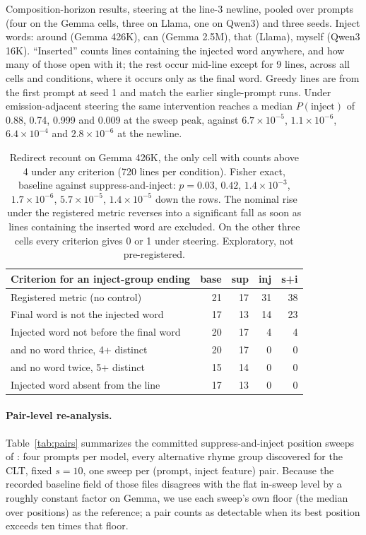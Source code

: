 \documentclass[11pt]{article}
\begin{document}
\begin{table}[t]
\caption{Composition-horizon results, steering at the line-3 newline, pooled over prompts (four on the Gemma cells, three on Llama, one on Qwen3) and three seeds. Inject words: around (Gemma 426K), can (Gemma 2.5M), that (Llama), myself (Qwen3 16K). ``Inserted'' counts lines containing the injected word anywhere, and how many of those open with it; the rest occur mid-line except for 9 lines, across all cells and conditions, where it occurs only as the final word. Greedy lines are from the first prompt at seed 1 and match the earlier single-prompt runs. Under emission-adjacent steering the same intervention reaches a median $P(\text{inject})$ of 0.88, 0.74, 0.999 and 0.009 at the sweep peak, against $6.7\times10^{-5}$, $1.1\times10^{-6}$, $6.4\times10^{-4}$ and $2.8\times10^{-6}$ at the newline.}
\label{tab:horizon}
\end{table}

\begin{table}[h]
\centering\footnotesize
\begin{tabular}{@{}R{4.1cm}rrrr@{}}
\toprule
Criterion for an inject-group ending & base & sup & inj & s+i \\
\midrule
Registered metric (no control) & 21 & 17 & 31 & 38 \\
Final word is not the injected word & 17 & 13 & 14 & 23 \\
Injected word not before the final word & 20 & 17 & 4 & 4 \\
\quad and no word thrice, 4+ distinct & 20 & 17 & 0 & 0 \\
\quad and no word twice, 5+ distinct & 15 & 14 & 0 & 0 \\
Injected word absent from the line & 17 & 13 & 0 & 0 \\
\bottomrule
\end{tabular}
\caption{Redirect recount on Gemma 426K, the only cell with counts above 4 under any criterion (720 lines per condition). Fisher exact, baseline against suppress-and-inject: $p=0.03$, $0.42$, $1.4\times10^{-3}$, $1.7\times10^{-6}$, $5.7\times10^{-5}$, $1.4\times10^{-5}$ down the rows. The nominal rise under the registered metric reverses into a significant fall as soon as lines containing the inserted word are excluded. On the other three cells every criterion gives 0 or 1 under steering. Exploratory, not pre-registered.}
\label{tab:sensitivity}
\end{table}

\paragraph{Pair-level re-analysis.}
Table~\ref{tab:pairs} summarizes the committed suppress-and-inject position sweeps of \citet{pliprs2026}: four prompts per model, every alternative rhyme group discovered for the CLT, fixed $s{=}10$, one sweep per (prompt, inject feature) pair. Because the recorded baseline field of those files disagrees with the flat in-sweep level by a roughly constant factor on Gemma, we use each sweep's own floor (the median over positions) as the reference; a pair counts as detectable when its best position exceeds ten times that floor.
\end{document}
